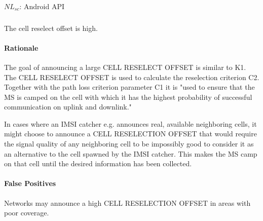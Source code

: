 \documentclass[a4paper,11pt,notitlepage,bigheadings,oneside]{scrartcl}
\begin{document}
$NL_{sc}$: Android API


\subsubsection{}

The cell reselect offset is high.

\paragraph{Rationale}

The goal of announcing a large CELL RESELECT OFFSET is similar to K1. The CELL
RESELECT OFFSET is used to calculate the reselection criterion C2. Together
with the path loss criterion parameter C1 it is "used to ensure that the MS is
camped on the cell with which it has the highest probability of successful
communication on uplink and downlink." \cite[6.4]{gsm0508}

In cases where an IMSI catcher e.g. announces real, available neighboring
cells, it might choose to announce a CELL RESELECTION OFFSET that would require
the signal quality of any neighboring cell to be impossibly good to consider it
as an alternative to the cell spawned by the IMSI catcher. This makes the MS
camp on that cell until the desired information has been collected.


%

\paragraph{False Positives}

Networks may announce a high CELL RESELECTION OFFSET in areas with poor
coverage.

\end{document}
